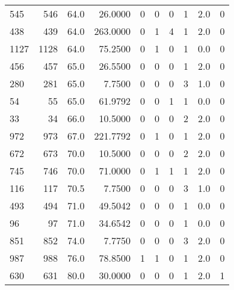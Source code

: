 \begin{tabular}{lrrrrrrrrr}
545  &          546 &  64.0 &   26.0000 &    0 &      0 &      0 &       1 &       2.0 &         0 \\
438  &          439 &  64.0 &  263.0000 &    0 &      1 &      4 &       1 &       2.0 &         0 \\
1127 &         1128 &  64.0 &   75.2500 &    0 &      1 &      0 &       1 &       0.0 &         0 \\
456  &          457 &  65.0 &   26.5500 &    0 &      0 &      0 &       1 &       2.0 &         0 \\
280  &          281 &  65.0 &    7.7500 &    0 &      0 &      0 &       3 &       1.0 &         0 \\
54   &           55 &  65.0 &   61.9792 &    0 &      0 &      1 &       1 &       0.0 &         0 \\
33   &           34 &  66.0 &   10.5000 &    0 &      0 &      0 &       2 &       2.0 &         0 \\
972  &          973 &  67.0 &  221.7792 &    0 &      1 &      0 &       1 &       2.0 &         0 \\
672  &          673 &  70.0 &   10.5000 &    0 &      0 &      0 &       2 &       2.0 &         0 \\
745  &          746 &  70.0 &   71.0000 &    0 &      1 &      1 &       1 &       2.0 &         0 \\
116  &          117 &  70.5 &    7.7500 &    0 &      0 &      0 &       3 &       1.0 &         0 \\
493  &          494 &  71.0 &   49.5042 &    0 &      0 &      0 &       1 &       0.0 &         0 \\
96   &           97 &  71.0 &   34.6542 &    0 &      0 &      0 &       1 &       0.0 &         0 \\
851  &          852 &  74.0 &    7.7750 &    0 &      0 &      0 &       3 &       2.0 &         0 \\
987  &          988 &  76.0 &   78.8500 &    1 &      1 &      0 &       1 &       2.0 &         0 \\
630  &          631 &  80.0 &   30.0000 &    0 &      0 &      0 &       1 &       2.0 &         1 \\
\bottomrule
\end{tabular}
